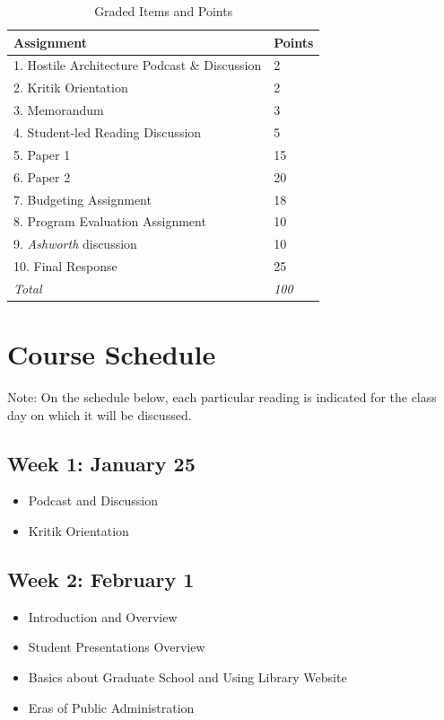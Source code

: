 \documentclass[10pt, letterpaper]{article}
\begin{document}
    \begin{table}[ht]
        \centering
        \caption{Graded Items and Points}
        \begin{tabular}{ll}
            \toprule
        \textbf{Assignment} & \textbf{Points} \\
        \midrule
        1. Hostile Architecture Podcast \& Discussion & 2 \\
        2. Kritik Orientation & 2 \\
        3. Memorandum & 3 \\
        4. Student-led Reading Discussion & 5 \\
        5. Paper 1 & 15 \\
        6. Paper 2 & 20 \\
        7. Budgeting Assignment & 18 \\
        8. Program Evaluation Assignment & 10 \\
        9. \emph{Ashworth} discussion & 10 \\
        10. Final Response & 25 \\ \bottomrule
        \emph{Total} & \emph{100} \\
        
        \end{tabular}
        \label{tab:grade-weights}
        \end{table}


\section*{Course Schedule}

\noindent Note: On the schedule below, each particular reading is indicated for the class day on which it will be discussed.  
    
    \subsection*{Week 1: January 25}
        \begin{itemize}
            \item Podcast and Discussion
            \item Kritik Orientation
        \end{itemize}

    \subsection*{Week 2: February 1} 
    \begin{itemize}
        \item Introduction and Overview
        \item Student Presentations Overview
        \item Basics about Graduate School and Using Library Website
        \item Eras of Public Administration
    \end{itemize}
\end{document}
